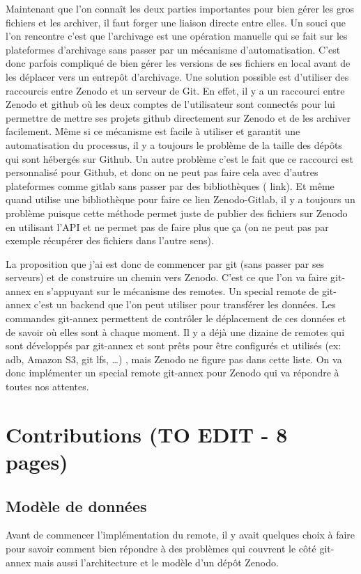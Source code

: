 \documentclass[11pt]{article}
\begin{document}
Maintenant que l’on connaît les deux parties importantes pour bien
gérer les gros fichiers et les archiver, il faut forger une liaison
directe entre elles. Un souci que l’on rencontre c’est que l’archivage
est une opération manuelle qui se fait sur les plateformes d’archivage
sans passer par un mécanisme d’automatisation. C’est donc parfois
compliqué de bien gérer les versions de ses fichiers en local avant de
les déplacer vers un entrepôt d’archivage. Une solution possible est
d’utiliser des raccourcis entre Zenodo et un serveur de Git. En effet,
il y a un raccourci entre Zenodo et github où les deux comptes de
l'utilisateur sont connectés pour lui permettre de mettre ses projets
github directement sur Zenodo et de les archiver facilement. Même si
ce mécanisme est facile à utiliser et garantit une automatisation du
processus, il y a toujours le problème de la taille des dépôts qui
sont hébergés sur Github. Un autre problème c’est le fait que ce
raccourci est personnalisé pour Github, et donc on ne peut pas faire
cela avec d'autres plateformes comme gitlab sans passer par des
bibliothèques ( link). Et même quand utilise une bibliothèque pour
faire ce lien Zenodo-Gitlab, il y a toujours un problème puisque cette
méthode permet juste de publier des fichiers sur Zenodo en utilisant
l'API et ne permet pas de faire plus que ça (on ne peut pas par
exemple récupérer des fichiers dans l’autre sens).


La proposition que j’ai est donc de commencer par git (sans passer par
ses serveurs) et de construire un chemin vers Zenodo. C’est ce que
l’on va faire git-annex en s’appuyant sur le mécanisme des remotes. Un
special remote de git-annex c’est un backend que l’on peut utiliser
pour transférer les données. Les commandes git-annex permettent de
contrôler le déplacement de ces données et de savoir où elles sont à
chaque moment. Il y a déjà une dizaine de remotes qui sont développés
par git-annex et sont prêts pour être configurés et utilisés (ex: adb,
Amazon S3, git lfs, …) , mais Zenodo ne figure pas dans cette
liste. On va donc implémenter un special remote git-annex pour Zenodo
qui va répondre à toutes nos attentes.

\section{Contributions (TO EDIT - 8 pages)}
\label{sec:orga7956f6}
\subsection{Modèle de données}
\label{sec:org70fd794}
Avant de commencer l’implémentation du remote, il y avait quelques
choix à faire pour savoir comment bien répondre à des problèmes qui
couvrent le côté git-annex mais aussi l’architecture et le modèle d’un
dépôt Zenodo.
\end{document}

